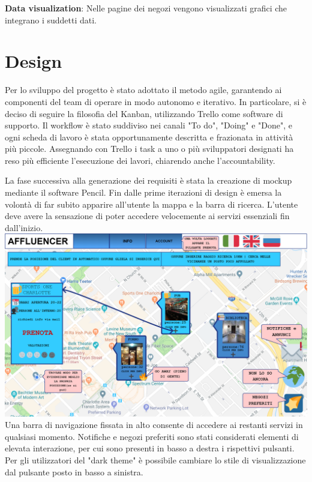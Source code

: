 \documentclass[a4paper]{report}
\begin{document}
\textbf{Data visualization}: Nelle pagine dei negozi vengono visualizzati grafici che integrano i suddetti dati.

\chapter{Design}

Per lo sviluppo del progetto è stato adottato il metodo agile, garantendo ai componenti del team di operare in modo autonomo e iterativo.
%
In particolare, si è deciso di seguire la filosofia del Kanban, utilizzando Trello come software di supporto.
%
Il workflow è stato suddiviso nei canali "To do", "Doing" e "Done", e ogni scheda di lavoro è stata opportunamente descritta e frazionata in attività più piccole.
%
Assegnando con Trello i task a uno o più sviluppatori designati ha reso più efficiente l'esecuzione dei lavori, chiarendo anche l'accountability.


La fase successiva alla generazione dei requisiti è stata la creazione di mockup mediante il software Pencil.
%
Fin dalle prime iterazioni di design è emersa la volontà di far subito apparire all'utente la mappa e la barra di ricerca.
%
L'utente deve avere la sensazione di poter accedere velocemente ai servizi essenziali fin dall'inizio.\\

\includegraphics[width=\textwidth]{mockup_home.png}\\

Una barra di navigazione fissata in alto consente di accedere ai restanti servizi in qualsiasi momento.
%
Notifiche e negozi preferiti sono stati considerati elementi di elevata interazione, per cui sono presenti in basso a destra i rispettivi pulsanti.
%
Per gli utilizzatori del "dark theme" è possibile cambiare lo stile di visualizzazione dal pulsante posto in basso a sinistra.
\end{document}
